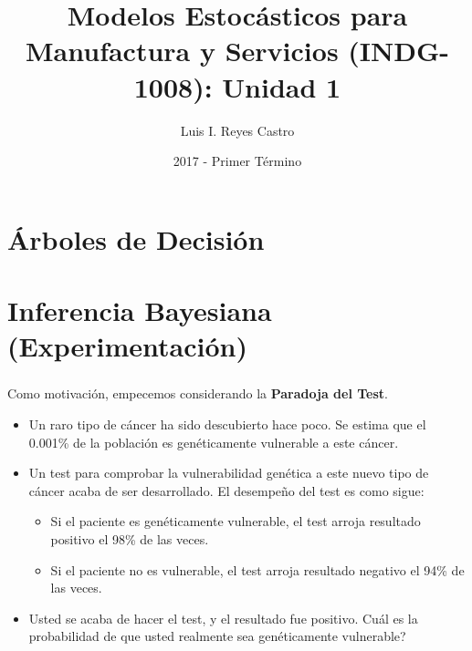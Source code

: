 \documentclass[ 10pt, xcolor = dvipsnames]{beamer}
\title[\shorttitle]{Modelos Estoc\'asticos para Manufactura y Servicios (INDG-1008): \textbf{Unidad 1} }
\author[L. I. Reyes Castro]{Luis I. Reyes Castro}
\institute[ESPOL]{\normalsize Escuela Superior Polit\'ecnica del Litoral (ESPOL) \\ Guayaquil - Ecuador}
\date[2017-T1]{2017 - Primer T\'ermino}
\begin{document}




\section{\'Arboles de Decisi\'on}

\begin{frame}[allowframebreaks]
\frametitle{\insertsection}

\end{frame}

\section{Inferencia Bayesiana (Experimentaci\'on)}

\begin{frame}[allowframebreaks]
\frametitle{\insertsection}

Como motivaci\'on, empecemos considerando la \textbf{Paradoja del Test}. 
\begin{itemize}
\item Un raro tipo de c\'ancer ha sido descubierto hace poco. Se estima que el 0.001\% de la poblaci\'on es gen\'eticamente vulnerable a este c\'ancer. 
\item Un test para comprobar la vulnerabilidad gen\'etica a este nuevo tipo de c\'ancer acaba de ser desarrollado. El desempe\~no del test es como sigue: 
\begin{itemize}
\item Si el paciente es gen\'eticamente vulnerable, el test arroja resultado positivo \linebreak el 98\% de las veces. 
\item Si el paciente no es vulnerable, el test arroja resultado negativo el 94\% \linebreak de las veces. 
\end{itemize}
\item Usted se acaba de hacer el test, y el resultado fue positivo. Cu\'al es la probabilidad de que usted realmente sea gen\'eticamente vulnerable? 
\end{itemize}

\end{frame}
\end{document}
